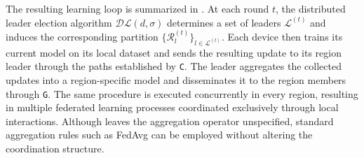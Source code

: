 The resulting learning loop is summarized in
.
%
At each round \(t\), the distributed leader election algorithm
\(\mathcal{DL}(d,\sigma)\) determines a set of leaders
\(\mathcal{L}^{(t)}\) and induces the corresponding partition
\(\{\mathcal{R}_l^{(t)}\}_{l \in \mathcal{L}^{(t)}}\).
%
Each device then trains its current model on its local dataset and sends the
resulting update to its region leader through the paths established by
\texttt{C}.
%
The leader aggregates the collected updates into a region-specific model and
disseminates it to the region members through \texttt{G}.
%
The same procedure is executed concurrently in every region, resulting in
multiple federated learning processes coordinated exclusively through local
interactions.
%
Although  leaves the aggregation operator unspecified,
standard aggregation rules such as \gls{FedAvg} can be employed without
altering the coordination structure.

